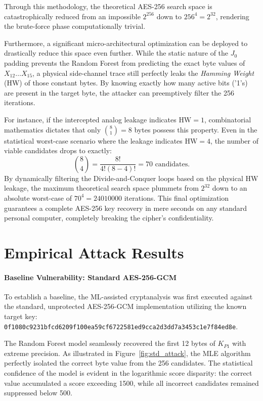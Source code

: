 \documentclass[11pt,a4paper]{report}
\begin{document}
Through this methodology, the theoretical AES-256 search space is catastrophically reduced from an impossible $2^{256}$ down to $256^4 = 2^{32}$, 
rendering the brute-force phase computationally trivial. 

Furthermore, a significant micro-architectural optimization can be deployed to drastically reduce this space even further. 
While the static nature of the $J_0$ padding prevents the Random Forest from predicting the exact byte values of $X_{12}\dots X_{15}$, 
a physical side-channel trace still perfectly leaks the \textit{Hamming Weight} (HW) of those constant bytes. 
By knowing exactly how many active bits ('1's) are present in the target byte, the attacker can preemptively filter the 256 iterations. 

For instance, if the intercepted analog leakage indicates $\text{HW} = 1$, combinatorial mathematics dictates that only $\binom{8}{1} = 8$ bytes possess this property. 
Even in the statistical worst-case scenario where the leakage indicates $\text{HW} = 4$, the number of viable candidates drops to exactly:
\[
    \binom{8}{4} = \frac{8!}{4!(8-4)!} = 70 \text{ candidates.}
\]
By dynamically filtering the Divide-and-Conquer loops based on the physical HW leakage, the maximum theoretical search space plummets from $2^{32}$ down to an absolute worst-case of $70^4 = 24010000$ iterations. 
This final optimization guarantees a complete AES-256 key recovery in mere seconds on any standard personal computer, completely breaking the cipher's confidentiality.

\section{Empirical Attack Results}
\paragraph{Baseline Vulnerability: Standard AES-256-GCM}
To establish a baseline, the ML-assisted cryptanalysis was first executed against the standard, unprotected AES-256-GCM implementation utilizing the known target key: \\
\texttt{0f1080c9231bfcd6209f100ea59cf6722581ed9cca2d3dd7a3453c1e7f84ed8e}.

The Random Forest model seamlessly recovered the first 12 bytes of $K_{P1}$ with extreme precision. 
As illustrated in Figure~\ref{fig:std_attack}, the MLE algorithm perfectly isolated the correct byte value from the 256 candidates. 
The statistical confidence of the model is evident in the logarithmic score disparity: 
the correct value accumulated a score exceeding 1500, while all incorrect candidates remained suppressed below 500. 
\end{document}
